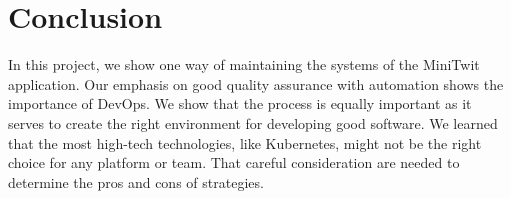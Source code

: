\documentclass[11pt]{article}
\begin{document}
\section{Conclusion}
In this project, we show one way of maintaining the systems of the MiniTwit application. Our emphasis on good quality assurance with automation shows the importance of DevOps. We show that the process is equally important as it serves to create the right environment for developing good software. We learned that the most high-tech technologies, like Kubernetes, might not be the right choice for any platform or team. That careful consideration are needed to determine the pros and cons of strategies.
\end{document}
